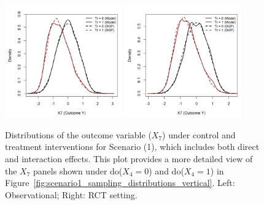 \begin{figure}[htbp]
\centering
\includegraphics[width=0.45\textwidth]{img/results/observ_scenario1_X7_treatment_densities.png}
\includegraphics[width=0.45\textwidth]{img/results/rct_scenario1_X7_treatment_densities.png}
\caption{Distributions of the outcome variable ($X_7$) under control and treatment interventions for Scenario (1), which includes both direct and interaction effects. This plot provides a more detailed view of the $X_7$ panels shown under do($X_4=0$) and do($X_4=1$) in Figure~\ref{fig:scenario1_sampling_distributions_vertical}. Left: Observational; Right: RCT setting.}
\label{fig:scenario1_outcome_distributions}
\end{figure}




